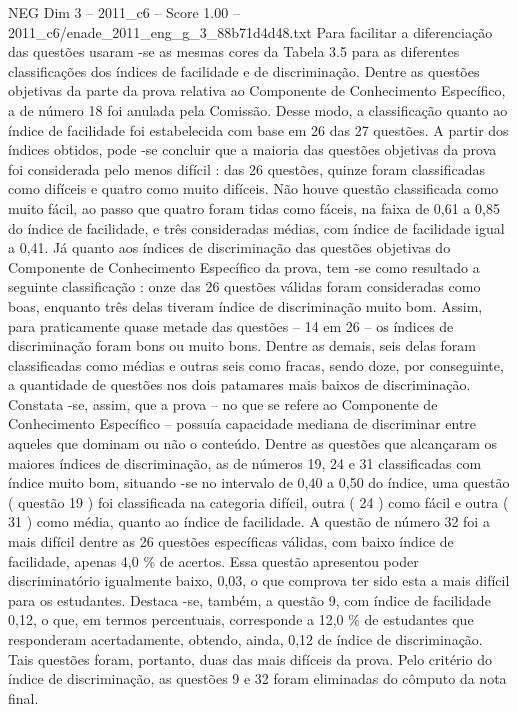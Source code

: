 \begin{textsample}{NEG Dim 3 – 2011\_c6 – Score 1.00 – 2011\_c6/enade\_2011\_eng\_g\_3\_88b71d4d48.txt}
Para facilitar a diferenciação das questões usaram -se as mesmas cores da Tabela 3.5 para as diferentes classificações dos índices de facilidade e de discriminação.
Dentre as questões objetivas da parte da prova relativa ao Componente de Conhecimento Específico, a de número 18 foi anulada pela Comissão.
Desse modo, a classificação quanto ao índice de facilidade foi estabelecida com base em 26 das 27 questões.
A partir dos índices obtidos, pode -se concluir que a maioria das questões objetivas da prova foi considerada pelo menos difícil : das 26 questões, quinze foram classificadas como difíceis e quatro como muito difíceis.
Não houve questão classificada como muito fácil, ao passo que quatro foram tidas como fáceis, na faixa de 0,61 a 0,85 do índice de facilidade, e três consideradas médias, com índice de facilidade igual a 0,41.
Já quanto aos índices de discriminação das questões objetivas do Componente de Conhecimento Específico da prova, tem -se como resultado a seguinte classificação : onze das 26 questões válidas foram consideradas como boas, enquanto três delas tiveram índice de discriminação muito bom.
Assim, para praticamente quase metade das questões – 14 em 26 – os índices de discriminação foram bons ou muito bons.
Dentre as demais, seis delas foram classificadas como médias e outras seis como fracas, sendo doze, por conseguinte, a quantidade de questões nos dois patamares mais baixos de discriminação.
Constata -se, assim, que a prova – no que se refere ao Componente de Conhecimento Específico – possuía capacidade mediana de discriminar entre aqueles que dominam ou não o conteúdo.
Dentre as questões que alcançaram os maiores índices de discriminação, as de números 19, 24 e 31 classificadas com índice muito bom, situando -se no intervalo de 0,40 a 0,50 do índice, uma questão ( questão 19 ) foi classificada na categoria difícil, outra ( 24 ) como fácil e outra ( 31 ) como média, quanto ao índice de facilidade.
A questão de número 32 foi a mais difícil dentre as 26 questões específicas válidas, com baixo índice de facilidade, apenas 4,0 \% de acertos.
Essa questão apresentou poder discriminatório igualmente baixo, 0,03, o que comprova ter sido esta a mais difícil para os estudantes.
Destaca -se, também, a questão 9, com índice de facilidade 0,12, o que, em termos percentuais, corresponde a 12,0 \% de estudantes que responderam acertadamente, obtendo, ainda, 0,12 de índice de discriminação.
Tais questões foram, portanto, duas das mais difíceis da prova.
Pelo critério do índice de discriminação, as questões 9 e 32 foram eliminadas do cômputo da nota final.

\end{textsample}
